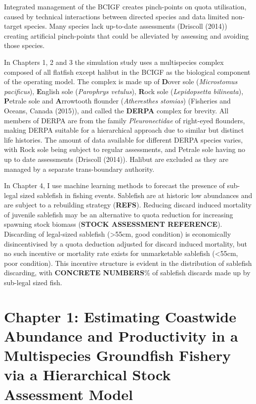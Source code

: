 \documentclass[12pt,]{scrartcl}
\begin{document}
Integrated management of the BCIGF creates pinch-points on quota
utilisation, caused by technical interactions between directed species
and data limited non-target species. Many species lack up-to-date
assessments (Driscoll (2014)) creating artificial pinch-points that
could be alleviated by assessing and avoiding those species.

In Chapters 1, 2 and 3 the simulation study uses a multispecies complex
composed of all flatfish except halibut in the BCIGF as the biological
component of the operating model. The complex is made up of
\textbf{D}over sole (\emph{Microstomus pacificus}), \textbf{E}nglish
sole (\emph{Parophrys vetulus}), \textbf{R}ock sole (\emph{Lepidopsetta
bilineata}), \textbf{P}etrale sole and \textbf{A}rrowtooth flounder
(\emph{Atheresthes stomias}) (Fisheries and Oceans, Canada (2015)), and
called the \textbf{DERPA} complex for brevity. All members of DERPA are
from the family \emph{Pleuronectidae} of right-eyed flounders, making
DERPA suitable for a hierarchical approach due to similar but distinct
life histories. The amount of data available for different DERPA species
varies, with Rock sole being subject to regular assessments, and Petrale
sole having no up to date assessments (Driscoll (2014)). Halibut are
excluded as they are managed by a separate trans-boundary authority.

In Chapter 4, I use machine learning methods to forecast the presence of
sub-legal sized sablefish in fishing events. Sablefish are at historic
low abundances and are subject to a rebuilding strategy (\textbf{REFS}).
Reducing discard induced mortality of juvenile sablefish may be an
alternative to quota reduction for increasing spawning stock biomass
(\textbf{STOCK ASSESSMENT REFERENCE}). Discarding of legal-sized
sablefish (\textgreater{}55cm, good condition) is economically
disincentivised by a quota deduction adjusted for discard induced
mortality, but no such incentive or mortality rate exists for
unmarketable sablefish (\textless{}55cm, poor condition). This incentive
structure is evident in the distribution of sablefish discarding, with
\textbf{CONCRETE NUMBERS}\% of sablefish discards made up by sub-legal
sized fish.

\section{Chapter 1: Estimating Coastwide Abundance and Productivity in a
Multispecies Groundfish Fishery via a Hierarchical Stock Assessment
Model}\label{chapter-1-estimating-coastwide-abundance-and-productivity-in-a-multispecies-groundfish-fishery-via-a-hierarchical-stock-assessment-model}
\end{document}
